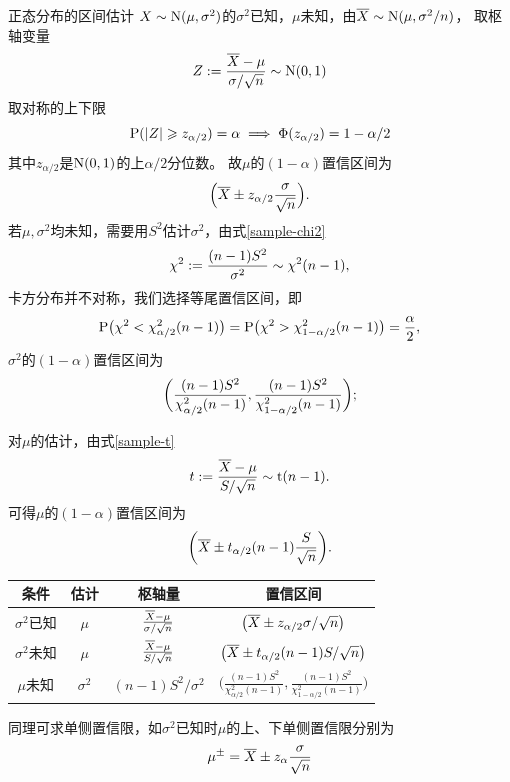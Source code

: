 \begin{example}{正态分布的区间估计}{}
	$X \sim \operatorname{N}(\mu,\sigma^2)$的$\sigma^2$已知，$\mu$未知，由$\overline{X} \sim \operatorname{N}(\mu,\sigma^2/n)$，
	取枢轴变量
	\[
		Z := \frac{\overline{X} - \mu}{\sigma/\sqrt n} \sim \operatorname{N}(0,1)
	\]
	取对称的上下限
	\[
		\operatorname{P}(\lvert Z\rvert \geqslant z_{\alpha/2}) = \alpha \implies \Phi(z_{\alpha/2}) = 1 - \alpha/2
	\]
	其中$z_{\alpha/2}$是$\operatorname{N}(0,1)$的上$\alpha/2$分位数。
	故$\mu$的$(1 - \alpha)$置信区间为
	\begin{equation}
		\Bigl(\overline{X} \pm z_{\alpha/2}\frac\sigma{\sqrt n}\Bigr).
	\end{equation}
	\tcblower
	若$\mu,\sigma^2$均未知，需要用$S^2$估计$\sigma^2$，由式\eqref{sample-chi2}
	\[
		\chi^2 := \frac{(n - 1)S^2}{\sigma^2} \sim \chi^2(n - 1),
	\]
	卡方分布并不对称，我们选择等尾置信区间，即
	\[
		\operatorname{P}\bigl(\chi^2 < \chi_{\alpha/2}^2(n - 1)\bigr) = \operatorname{P}\bigl(\chi^2 > \chi_{1-\alpha/2}^2(n - 1)\bigr) = \frac\alpha{2},
	\]
	$\sigma^2$的$(1 - \alpha)$置信区间为
	\begin{equation}
		\biggl(\frac{(n - 1)S^2}{\chi_{\alpha/2}^2(n - 1)},\frac{(n - 1)S^2}{\chi_{1-\alpha/2}^2(n - 1)}\biggr);
	\end{equation}

	对$\mu$的估计，由式\eqref{sample-t}
	\[
		t := \frac{\overline{X} - \mu}{S/\sqrt n} \sim \operatorname{t}(n - 1).
	\]
	可得$\mu$的$(1 - \alpha)$置信区间为
	\begin{equation}
		\biggl(\overline{X} \pm t_{\alpha/2}(n - 1)\frac{S}{\sqrt n}\biggr).
	\end{equation}
	\begin{notecaptionblock}
		\begin{tabular}{cccc}
			\toprule
			条件&估计&枢轴量&置信区间\\
			\midrule
			$\sigma^2$已知&$\mu$&$\frac{\overline{X} - \mu}{\sigma/\sqrt n}$&$\bigl(\overline{X} \pm z_{\alpha/2}\sigma/\sqrt n\bigr)$\\[2ex]
			$\sigma^2$未知&$\mu$&$\frac{\overline{X} - \mu}{S/\sqrt n}$&$\bigl(\overline{X} \pm t_{\alpha/2}(n - 1)S/\sqrt n\bigr)$\\[2ex]
			$\mu$未知&$\sigma^2$&$(n - 1)S^2/\sigma^2$&$\biggl(\frac{(n - 1)S^2}{\chi_{\alpha/2}^2(n - 1)},\frac{(n - 1)S^2}{\chi_{1-\alpha/2}^2(n - 1)}\biggr)$\\
			\bottomrule
		\end{tabular}
	\end{notecaptionblock}
	同理可求单侧置信限，如$\sigma^2$已知时$\mu$的上、下单侧置信限分别为
	\begin{equation}\label{eq:ps-one-sided-normal-limits}
		\mu^\pm = \overline{X} \pm z_\alpha\frac\sigma{\sqrt n}
	\end{equation}
\end{example}
